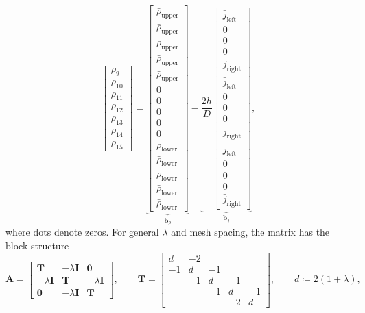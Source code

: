 \documentclass[11pt,a4paper]{article}
\numberwithin{equation}{section}
\theoremstyle{definition}
\theoremstyle{remark}
\newcommand{\bA}{\mathbf{A}}
\newcommand{\bT}{\mathbf{T}}
\newcommand{\bI}{\mathbf{I}}
\newcommand{\bb}{\bm{b}}
\newcommand{\rhoUpper}{\bar{\rho}_{\mathrm{upper}}}
\newcommand{\rhoLower}{\bar{\rho}_{\mathrm{lower}}}
\newcommand{\jleft}{\bar{j}_{\mathrm{left}}}
\newcommand{\jright}{\bar{j}_{\mathrm{right}}}
\begin{document}
\begin{equation}
\begin{bmatrix}
    \rho_9 \\ \rho_{10} \\ \rho_{11} \\ \rho_{12} \\ \rho_{13} \\ \rho_{14} \\ \rho_{15}
  \end{bmatrix}
  =
  \underbrace{\begin{bmatrix}
    \rhoUpper \\ \rhoUpper \\ \rhoUpper \\ \rhoUpper \\ \rhoUpper \\
    0 \\ 0 \\ 0 \\ 0 \\ 0 \\
    \rhoLower \\ \rhoLower \\ \rhoLower \\ \rhoLower \\ \rhoLower
  \end{bmatrix}}_{\bb_\rho}
  -
  \underbrace{\frac{2h}{D}
  \begin{bmatrix}
    \jleft \\ 0 \\ 0 \\ 0 \\ \jright \\
    \jleft \\ 0 \\ 0 \\ 0 \\ \jright \\
    \jleft \\ 0 \\ 0 \\ 0 \\ \jright
  \end{bmatrix}}_{\bb_j},
\end{equation}
\endgroup
where dots denote zeros. For general $\lambda$ and mesh spacing, the matrix has the block
structure
\begin{equation}\label{eq:block}
  \bA =
  \begin{bmatrix}
    \bT & -\lambda\bI & \mathbf{0} \\
    -\lambda\bI & \bT & -\lambda\bI \\
    \mathbf{0} & -\lambda\bI & \bT
  \end{bmatrix},
  \qquad
  \bT =
  \begin{bmatrix}
    d & -2 & & & \\
    -1 & d & -1 & & \\
    & -1 & d & -1 & \\
    & & -1 & d & -1 \\
    & & & -2 & d
  \end{bmatrix},
  \qquad
  d \coloneqq 2(1 + \lambda),
\end{equation}
\end{document}
